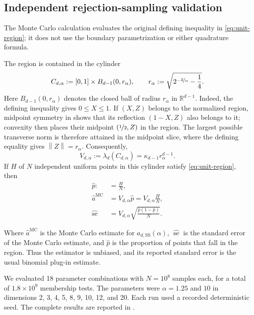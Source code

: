 \documentclass[a4paper,fleqn]{cas-dc}
\theoremstyle{definition}
\theoremstyle{remark}
\newcommand{\R}{\mathds{R}}
\newcommand{\norm}[1]{\left\lVert #1\right\rVert}
\newcommand{\0}{\mathbf{0}}
\begin{document}
\subsection{Independent rejection-sampling validation}

The Monte Carlo calculation evaluates the original defining inequality in
\eqref{eq:unit-region}; it does not use the boundary parametrization or either
quadrature formula. 

The region is contained in the cylinder
\begin{equation}
    C_{d,\alpha}
    :=[0,1]\times B_{d-1}(0,r_\alpha),
    \qquad
    r_\alpha:=\sqrt{2^{-\nicefrac{2}{\alpha}}-\frac14}.
\end{equation}
Here $B_{d-1}(0,r_\alpha)$ denotes the closed ball of radius
$r_\alpha$ in $\R^{d-1}$.
Indeed, the defining inequality gives $0\leq X\leq1$. If $(X,Z)$ belongs to
the normalized region, midpoint symmetry in  shows that
its reflection $(1-X,Z)$ also belongs to it; convexity then places their
midpoint $(\nicefrac{1}{2},Z)$ in the region. The largest
possible transverse norm is therefore attained in the midpoint slice, where
the defining equality gives $\norm{Z}=r_\alpha$. Consequently,
\begin{equation}
    V_{d,\alpha}:=\lambda_d(C_{d,\alpha})
    =\kappa_{d-1}r_\alpha^{d-1}.
\end{equation}
If $H$ of $N$ independent uniform points in this cylinder satisfy
\eqref{eq:unit-region}, then
\begin{equation}
\begin{aligned}
\widehat p
:&=\frac{H}{N},
\\
\widehat a^{\mathrm{MC}}
&=
V_{d,\alpha}\widehat p
=
V_{d,\alpha}\frac{H}{N},
\\
\widehat{\operatorname{se}}
&=
V_{d,\alpha}
\sqrt{
\frac{\widehat p(1-\widehat p)}{N}
}.
\end{aligned}
\end{equation}


Where \(\widehat a^{\mathrm{MC}}\) is the Monte Carlo estimate for
\(a_{d,\mathrm{SS}}(\alpha)\),
\(\widehat{\operatorname{se}}\) is the standard error of the Monte Carlo estimate,
and \(\widehat p\) is the proportion of points that fall in the region. 
Thus the estimator is unbiased, and its reported standard error is the usual
binomial plug-in estimate.

We evaluated 18 parameter combinations with $N=10^8$ samples each, for a
total of $1.8\times10^9$ membership tests. The parameters were
$\alpha=1.25$ and $10$ in dimensions 2, 3, 4, 5, 8, 9, 10, 12, and 20.
Each run used a recorded deterministic seed. The complete results are
reported in .
\end{document}

